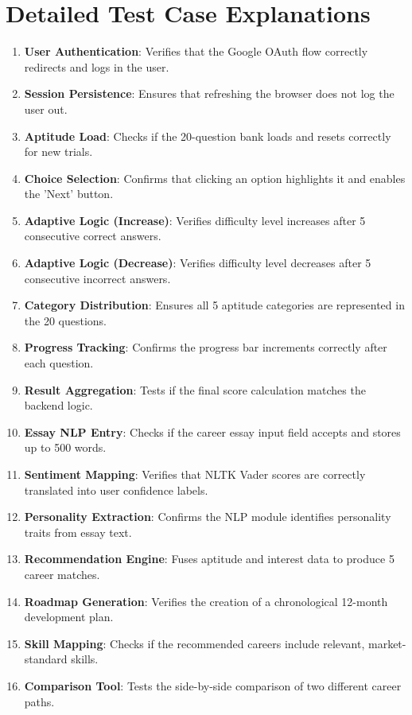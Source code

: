 \section{Detailed Test Case Explanations}
\begin{enumerate}
    \item \textbf{User Authentication}: Verifies that the Google OAuth flow correctly redirects and logs in the user.
    \item \textbf{Session Persistence}: Ensures that refreshing the browser does not log the user out.
    \item \textbf{Aptitude Load}: Checks if the 20-question bank loads and resets correctly for new trials.
    \item \textbf{Choice Selection}: Confirms that clicking an option highlights it and enables the 'Next' button.
    \item \textbf{Adaptive Logic (Increase)}: Verifies difficulty level increases after 5 consecutive correct answers.
    \item \textbf{Adaptive Logic (Decrease)}: Verifies difficulty level decreases after 5 consecutive incorrect answers.
    \item \textbf{Category Distribution}: Ensures all 5 aptitude categories are represented in the 20 questions.
    \item \textbf{Progress Tracking}: Confirms the progress bar increments correctly after each question.
    \item \textbf{Result Aggregation}: Tests if the final score calculation matches the backend logic.
    \item \textbf{Essay NLP Entry}: Checks if the career essay input field accepts and stores up to 500 words.
    \item \textbf{Sentiment Mapping}: Verifies that NLTK Vader scores are correctly translated into user confidence labels.
    \item \textbf{Personality Extraction}: Confirms the NLP module identifies personality traits from essay text.
    \item \textbf{Recommendation Engine}: Fuses aptitude and interest data to produce 5 career matches.
    \item \textbf{Roadmap Generation}: Verifies the creation of a chronological 12-month development plan.
    \item \textbf{Skill Mapping}: Checks if the recommended careers include relevant, market-standard skills.
    \item \textbf{Comparison Tool}: Tests the side-by-side comparison of two different career paths.

\end{enumerate}
